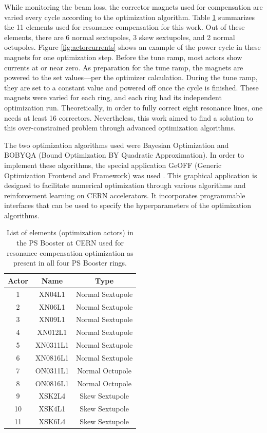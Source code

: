 While monitoring the beam loss, the corrector magnets used for compensation are varied every cycle according to the optimization algorithm. Table \ref{tab:psbcomp} summarizes the 11 elements used for resonance compensation for this work. Out of these elements, there are 6 normal sextupoles, 3 skew sextupoles, and 2 normal octupoles. Figure \ref{fig:actorcurrents} shows an example of the power cycle in these magnets for one optimization step. Before the tune ramp, most actors show currents at or near zero. As preparation for the tune ramp, the magnets are powered to the set values---per the optimizer calculation. During the tune ramp, they are set to a constant value and powered off once the cycle is finished. These magnets were varied for each ring, and each ring had its independent optimization run. Theoretically, in order to fully correct eight resonance lines, one needs at least 16 correctors. Nevertheless, this work aimed to find a solution to this over-constrained problem through advanced optimization algorithms. 

The two optimization algorithms used were Bayesian Optimization and BOBYQA (Bound Optimization BY Quadratic Approximation). In order to implement these algorithms, the special application GeOFF (Generic Optimization Frontend and Framework) was used \cite{geoff}. This graphical application is designed to facilitate numerical optimization through various algorithms and reinforcement learning on CERN accelerators. It incorporates programmable interfaces that can be used to specify the hyperparameters of the optimization algorithms.  

\begin{table}[H]
    \centering
    \caption{List of elements (optimization actors) in the PS Booster at CERN used for resonance compensation optimization as present in all four PS Booster rings.}
    \label{tab:psbcomp}
    \begin{tabular}{|c|c|c|}
    \hline
    \textbf{Actor} & \textbf{Name} & \textbf{Type}    \\ \hline
    1 & XN04L1    & Normal Sextupole \\ \hline
    2 & XN06L1    & Normal Sextupole \\ \hline
    3 & XN09L1    & Normal Sextupole \\ \hline
    4 & XN012L1    & Normal Sextupole \\ \hline
    5 & XN0311L1    & Normal Sextupole   \\ \hline
    6 & XN0816L1    & Normal Sextupole   \\ \hline
    7 & ON0311L1    & Normal Octupole  \\ \hline
    8 & ON0816L1    & Normal Octupole   \\ \hline
    9 & XSK2L4    & Skew Sextupole  \\ \hline
    10 & XSK4L1    & Skew Sextupole   \\ \hline
    11 & XSK6L4    & Skew Sextupole   \\ \hline
    \end{tabular}
\end{table}

